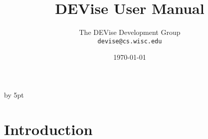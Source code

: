 %


\renewcommand{\topfraction}{1.0}
\renewcommand{\bottomfraction}{1.0}
\renewcommand{\textfraction}{0.0}
\advance\intextsep by 5pt

\def\filename#1{{\tt #1}}
\def\code#1{{\tt #1}}
\def\menu#1{{\tt #1}}
\def\term#1{#1}
\def\variable#1{{\tt #1}}

\def\scaleepspic[#1]#2#3{
\begin{figure}[htb]
\centering\leavevmode\epsfxsize=#1\epsfbox{#2}
\caption{#3}
\end{figure}
}

\def\fullepspic#1#2{
\begin{figure}[htb]
\centering\leavevmode\epsfxsize=\textwidth\epsfbox{#1}
\caption{#2}
\end{figure}
}


\title{DEVise User Manual}
\author{The DEVise Development Group \\
\code{devise@cs.wisc.edu}
}
\date{\today}

\maketitle


\section{Introduction}

